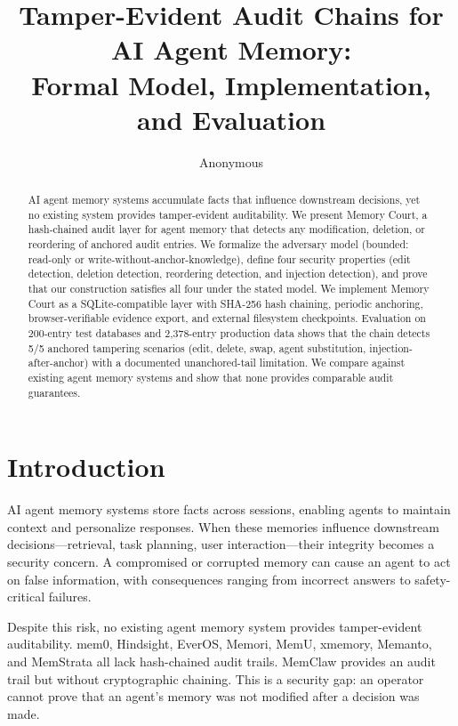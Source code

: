 \documentclass[sigconf,nonacm]{acmart}
\title{Tamper-Evident Audit Chains for AI Agent Memory:\\Formal Model, Implementation, and Evaluation}
\author{Anonymous}
\affiliation{\institution{Anonymous Institution}\city{Anonymous}\country{Anonymous}}
\begin{document}
\begin{abstract}
AI agent memory systems accumulate facts that influence downstream decisions, yet no existing system provides tamper-evident auditability. We present Memory Court, a hash-chained audit layer for agent memory that detects any modification, deletion, or reordering of anchored audit entries. We formalize the adversary model (bounded: read-only or write-without-anchor-knowledge), define four security properties (edit detection, deletion detection, reordering detection, and injection detection), and prove that our construction satisfies all four under the stated model. We implement Memory Court as a SQLite-compatible layer with SHA-256 hash chaining, periodic anchoring, browser-verifiable evidence export, and external filesystem checkpoints. Evaluation on 200-entry test databases and 2,378-entry production data shows that the chain detects 5/5 anchored tampering scenarios (edit, delete, swap, agent substitution, injection-after-anchor) with a documented unanchored-tail limitation. We compare against existing agent memory systems and show that none provides comparable audit guarantees.
\end{abstract}


\maketitle

\section{Introduction}
AI agent memory systems store facts across sessions, enabling agents to maintain context and personalize responses. When these memories influence downstream decisions---retrieval, task planning, user interaction---their integrity becomes a security concern. A compromised or corrupted memory can cause an agent to act on false information, with consequences ranging from incorrect answers to safety-critical failures.

Despite this risk, no existing agent memory system provides tamper-evident auditability. mem0, Hindsight, EverOS, Memori, MemU, xmemory, Memanto, and MemStrata all lack hash-chained audit trails. MemClaw provides an audit trail but without cryptographic chaining. This is a security gap: an operator cannot prove that an agent's memory was not modified after a decision was made.
\end{document}

